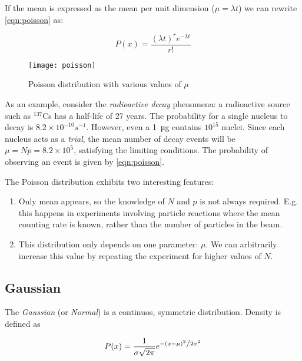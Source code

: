 If the mean is expressed as the mean per unit dimension ($\mu = \lambda t$) we can rewrite \ref{eqn:poisson} as:

\begin{equation}
	P\left( x \right) = \frac{(\lambda t) ^r {e^{ - \lambda t}} }{{r!}}
\end{equation}

\begin{figure}
	\centerline{
		\texttt{[image: poisson]}}
	\caption{Poisson distribution with various values of $\mu$ \cite{leo2012techniques}}
\end{figure}


As an example, consider the \textit{radioactive decay} phenomena: a radioactive source such as $^{137}$Cs has a half-life of 27 years. The probability for a single nucleus to decay is $8.2 \times 10^{-10}s^{-1}$. However, even a \SI{1}{\micro\gram} contains $10^{15}$ nuclei. Since each nucleus acts as a \textit{trial}, the mean number of decay events will be $\mu = N p = 8.2 \times 10^5$, satisfying the limiting conditions. The probability of observing an event is given by \ref{eqn:poisson}.

The Poisson distribution exhibits two interesting features:

\begin{enumerate}
	\item Only mean appears, so the knowledge of $N$ and $p$ is not always required. E.g. this happens in experiments involving particle reactions where the mean counting rate is known, rather than the number of particles in the beam.

	\item This distribution only depends on one parameter: $\mu$. We can arbitrarily increase this value by repeating the experiment for higher values of $N$.
\end{enumerate}

\subsection{Gaussian}
\label{eqn:gaussian}


The \textit{Gaussian} (or \textit{Normal}) is a continuos, symmetric distribution. Density is defined as

\begin{equation}
	P(x) = \frac{1}{{\sigma \sqrt {2\pi } }}e^{{{ - \left( {x - \mu } \right)^2 } \mathord{\left/ {\vphantom {{ - \left( {x - \mu } \right)^2 } {2\sigma ^2 }}} \right. \kern-\nulldelimiterspace} {2\sigma ^2 }}}
\end{equation}

